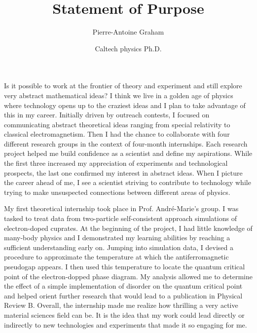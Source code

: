 \documentclass[12pt]{article}
\title{Statement of Purpose}
\author{Pierre-Antoine Graham}
\date{Caltech physics Ph.D.}
\begin{document}
\maketitle


Is it possible to work at the frontier of theory and experiment and still explore very abstract mathematical ideas? I think we live in a golden age of physics where technology opens up to the craziest ideas and I plan to take advantage of this in my career. Initially driven by outreach contests, I focused on communicating abstract theoretical ideas ranging from special relativity to classical electromagnetism. Then I had the chance to collaborate with four different research groups in the context of four-month internships. Each research project helped me build confidence as a scientist and define my aspirations. While the first three increased my appreciation of experiments and technological prospects, the last one confirmed my interest in abstract ideas. When I picture the career ahead of me, I see a scientist striving to contribute to technology while trying to make unsuspected connections between different areas of physics. 
\vspace{0.4cm}

My first theoretical internship took place in Prof. André-Marie's group. I was tasked to treat data from two-particle self-consistent approach simulations of electron-doped cuprates. At the beginning of the project, I had little knowledge of many-body physics and I demonstrated my learning abilities by reaching a sufficient understanding early on. Jumping into simulation data, I devised a procedure to approximate the temperature at which the antiferromagnetic pseudogap appears. I then used this temperature to locate the quantum critical point of the electron-dopped phase diagram. My analysis allowed me to determine the effect of a simple implementation of disorder on the quantum critical point and helped orient further research that would lead to a publication in Physical Review B. Overall, the internship made me realize how thrilling a very active material sciences field can be. It is the idea that my work could lead directly or indirectly to new technologies and experiments that made it so engaging for me.\vspace{0.4cm} 
\end{document}
